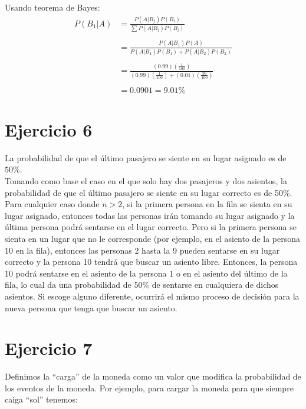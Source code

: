 \documentclass[letterpaper,12pt]{memoir}
\theoremstyle{definition}
\begin{document}
Usando teorema de Bayes:\\

\begin{align*}
  P(B_1|A) & = \frac{P(A|B_j)P(B_i)}{\sum P(A|B_i)P(B_i)}\\
           & \\ 
           &  = \frac{P(A|B_1)P(A)}{P(A|B_1)P(B_1)+P(A|B_2)P(B_2)}\\
           & \\
           & = \frac{(0.99)(\frac{1}{100})}{(0.99)(\frac{1}{100}) + (0.01)(\frac{99}{100})}\\
           & \\
           & = 0.0901 = 9.01\%
\end{align*}


\section*{Ejercicio 6}

La probabilidad de que el último pasajero se siente en su lugar asignado es de \(50\%\). \\

Tomando como base el caso en el que solo hay dos pasajeros y dos asientos, la probabilidad de que el último pasajero se siente en su lugar correcto es de 50\%.\\

Para cualquier caso donde \(n > 2\), si la primera persona en la fila se sienta en su lugar asignado, entonces todas las personas irán tomando su lugar asignado y la última persona podrá sentarse en el lugar correcto. Pero si la primera persona se sienta en un lugar que no le corresponde (por ejemplo, en el asiento de la persona 10 en la fila), entonces las personas 2 hasta la 9 pueden sentarse en su lugar correcto y la persona 10 tendrá que buscar un asiento libre. Entonces, la persona 10 podrá sentarse en el asiento de la persona 1 o en el asiento del último de la fila, lo cual da una probabilidad de 50\% de sentarse en cualquiera de dichos asientos. Si escoge alguno diferente, ocurrirá el mismo proceso de decisión para la nueva persona que tenga que buscar un asiento.
\section*{Ejercicio 7}

Definimos la ``carga'' de la moneda como un valor que modifica la probabilidad de los eventos de la moneda. Por ejemplo, para cargar la moneda para que siempre caiga ``sol'' tenemos:
\end{document}
